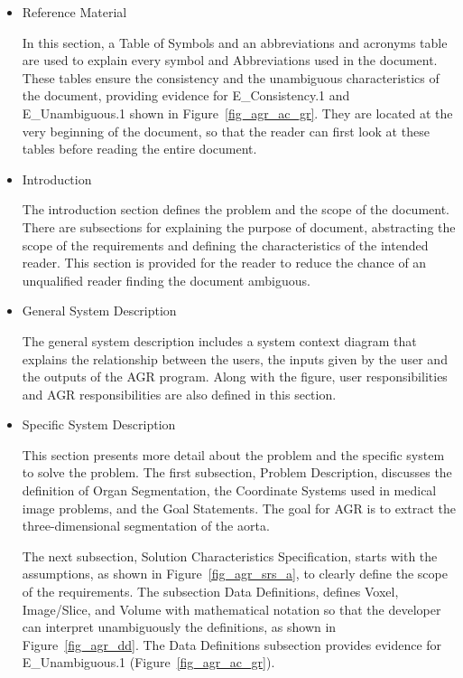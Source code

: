 \begin{itemize}
\item Reference Material

In this section, a Table of Symbols and an abbreviations and acronyms table are used to explain every symbol and Abbreviations used in the document. These tables ensure the consistency and the unambiguous characteristics of the document, providing evidence for E\_Consistency.1 and E\_Unambiguous.1 shown in Figure~\ref{fig_agr_ac_gr}. They are located at the very beginning of the document, so that the reader can first look at these tables before reading the entire document. 

\item Introduction

The introduction section defines the problem and the scope of the document.  There are subsections for explaining the purpose of document, abstracting the scope of the requirements and defining the characteristics of the intended reader. This section is provided for the reader to reduce the chance of an unqualified reader finding the document ambiguous.

\item General System Description

The general system description includes a system context diagram that explains the relationship between the users, the inputs given by the user and the outputs of the AGR program. Along with the figure, user responsibilities and AGR responsibilities are also defined in this section.

\item Specific System Description

This section presents more detail about the problem and the specific system to solve the problem. The first subsection, Problem Description, discusses the definition of Organ Segmentation, the Coordinate Systems used in medical image problems, and the Goal Statements. The goal for AGR is to extract the three-dimensional segmentation of the aorta.

\hspace{\enumerateparindent}The next subsection, Solution Characteristics Specification, starts with the assumptions, as shown in Figure~\ref{fig_agr_srs_a},  to clearly define the scope of the requirements. The subsection Data Definitions, defines Voxel, Image/Slice, and Volume with mathematical notation so that the developer can interpret unambiguously the definitions, as shown in Figure~\ref{fig_agr_dd}.  The Data Definitions subsection provides evidence for E\_Unambiguous.1 (Figure~\ref{fig_agr_ac_gr}).


\end{itemize}
